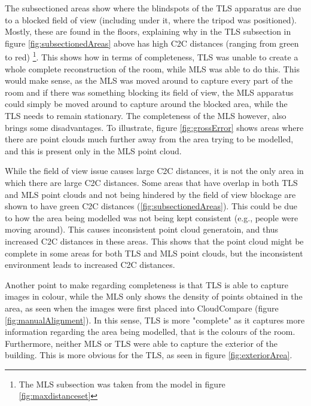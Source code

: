 \documentclass[man]{apa7}
\begin{document}
The subsectioned areas show where the blindspots of the TLS apparatus are due to a blocked field of view (including under it, where the tripod was positioned). Mostly, these are found in the floors, explaining why in the TLS subsection in figure \ref{fig:subsectionedAreas} above has high C2C distances (ranging from green to red) \footnote{The MLS subsection was taken from the model in figure \ref{fig:maxdistanceset}}. This shows how in terms of completeness, TLS was unable to create a whole complete reconstruction of the room, while MLS was able to do this. This would make sense, as the MLS was moved around to capture every part of the room and if there was something blocking its field of view, the MLS apparatus could simply be moved around to capture around the blocked area, while the TLS needs to remain stationary. The completeness of the MLS however, also brings some disadvantages. To illustrate, figure \ref{fig:grossError} shows areas where there are point clouds much further away from the area trying to be modelled, and this is present only in the MLS point cloud.

While the field of view issue causes large C2C distances, it is not the only area in which there are large C2C distances. Some areas that have overlap in both TLS and MLS point clouds and not being hindered by the field of view blockage are shown to have green C2C distances (\ref{fig:subsectionedAreas}). This could be due to how the area being modelled was not being kept consistent (e.g., people were moving around). This causes inconsistent point cloud generatoin, and thus increased C2C distances in these areas. This shows that the point cloud might be complete in some areas for both TLS and MLS point clouds, but the inconsistent environment leads to increased C2C distances.

Another point to make regarding completeness is that TLS is able to capture images in colour, while the MLS only shows the density of points obtained in the area, as seen when the images were first placed into CloudCompare (figure \ref{fig:manualAlignment}). In this sense, TLS is more "complete" as it captures more information regarding the area being modelled, that is the colours of the room. Furthermore, neither MLS or TLS were able to capture the exterior of the building. This is more obvious for the TLS, as seen in figure \ref{fig:exteriorArea}.
\end{document}
